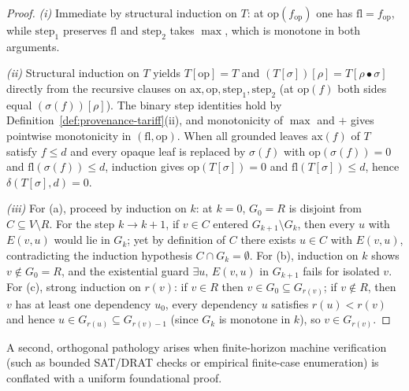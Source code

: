 \documentclass[11pt]{article}
\theoremstyle{plain}
\theoremstyle{definition}
\begin{document}
\begin{proof}
\emph{(i)} Immediate by structural induction on $T$: at $\mathrm{op}(f_{\mathrm{op}})$ one has $\mathrm{fl} = f_{\mathrm{op}}$, while $\mathrm{step}_1$ preserves $\mathrm{fl}$ and $\mathrm{step}_2$ takes $\max$, which is monotone in both arguments.

\emph{(ii)} Structural induction on $T$ yields $T[\mathrm{op}] = T$ and $(T[\sigma])[\rho] = T[\rho \bullet \sigma]$ directly from the recursive clauses on $\mathrm{ax}, \mathrm{op}, \mathrm{step}_1, \mathrm{step}_2$ (at $\mathrm{op}(f)$ both sides equal $(\sigma(f))[\rho]$). The binary step identities hold by Definition~\ref{def:provenance-tariff}(ii), and monotonicity of $\max$ and $+$ gives pointwise monotonicity in $(\mathrm{fl}, \mathrm{op})$. When all grounded leaves $\mathrm{ax}(f)$ of $T$ satisfy $f \le d$ and every opaque leaf is replaced by $\sigma(f)$ with $\mathrm{op}(\sigma(f)) = 0$ and $\mathrm{fl}(\sigma(f)) \le d$, induction gives $\mathrm{op}(T[\sigma]) = 0$ and $\mathrm{fl}(T[\sigma]) \le d$, hence $\delta(T[\sigma], d) = 0$.

\emph{(iii)} For (a), proceed by induction on $k$: at $k = 0$, $G_0 = R$ is disjoint from $C \subseteq V \setminus R$. For the step $k \to k+1$, if $v \in C$ entered $G_{k+1} \setminus G_k$, then every $u$ with $E(v, u)$ would lie in $G_k$; yet by definition of $C$ there exists $u \in C$ with $E(v, u)$, contradicting the induction hypothesis $C \cap G_k = \emptyset$. For (b), induction on $k$ shows $v \notin G_0 = R$, and the existential guard $\exists u,\, E(v, u)$ in $G_{k+1}$ fails for isolated $v$. For (c), strong induction on $r(v)$: if $v \in R$ then $v \in G_0 \subseteq G_{r(v)}$; if $v \notin R$, then $v$ has at least one dependency $u_0$, every dependency $u$ satisfies $r(u) < r(v)$ and hence $u \in G_{r(u)} \subseteq G_{r(v)-1}$ (since $G_k$ is monotone in $k$), so $v \in G_{r(v)}$.
\end{proof}

A second, orthogonal pathology arises when finite-horizon machine verification (such as bounded SAT/DRAT checks or empirical finite-case enumeration) is conflated with a uniform foundational proof.
\end{document}
